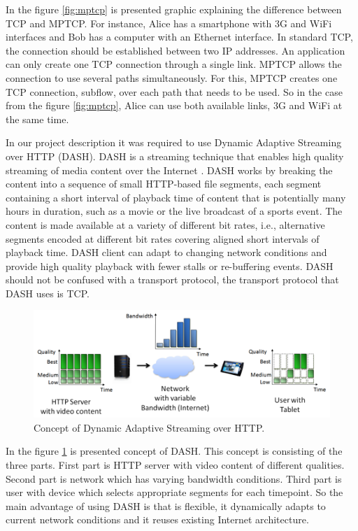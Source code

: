 \documentclass{llncs}
\begin{document}
In the figure \ref{fig:mptcp} is presented graphic explaining the difference between TCP and MPTCP.  For instance, Alice has a smartphone with 3G and WiFi interfaces and Bob has a computer with an Ethernet interface. In standard TCP, the connection should be established between two IP addresses. An application can only create one TCP connection through a single link. MPTCP allows the connection to use several paths simultaneously. For this, MPTCP creates one TCP connection, subflow, over each path that needs to be used. So in the case from the figure \ref{fig:mptcp},  Alice can use both available links, 3G and WiFi at the same time.

In our project description it was required to use Dynamic Adaptive Streaming over HTTP (DASH). DASH is a streaming technique that enables high quality streaming of media content over the Internet \cite{DASH}. DASH works by breaking the content into a sequence of small HTTP-based file segments, each segment containing a short interval of playback time of content that is potentially many hours in duration, such as a movie or the live broadcast of a sports event. The content is made available at a variety of different bit rates, i.e., alternative segments encoded at different bit rates covering aligned short intervals of playback time. DASH client can adapt to changing network conditions and provide high quality playback with fewer stalls or re-buffering events. DASH should not be confused with a transport protocol, the transport protocol that DASH uses is TCP.

\begin{figure}[H]
\centering
\includegraphics[width=1.0\textwidth]{DASH.png}
\caption{\label{fig:dash} Concept of Dynamic Adaptive Streaming over HTTP.}
\end{figure}

In the figure \ref{fig:dash} is presented concept of DASH. This concept is consisting of the three parts. First part is HTTP server with video content of different qualities. Second part is network which has varying bandwidth conditions. Third part is user with device which selects appropriate segments for each timepoint. So the main advantage of using DASH is that is flexible, it dynamically adapts to current network conditions and it reuses existing Internet architecture.
\end{document}
